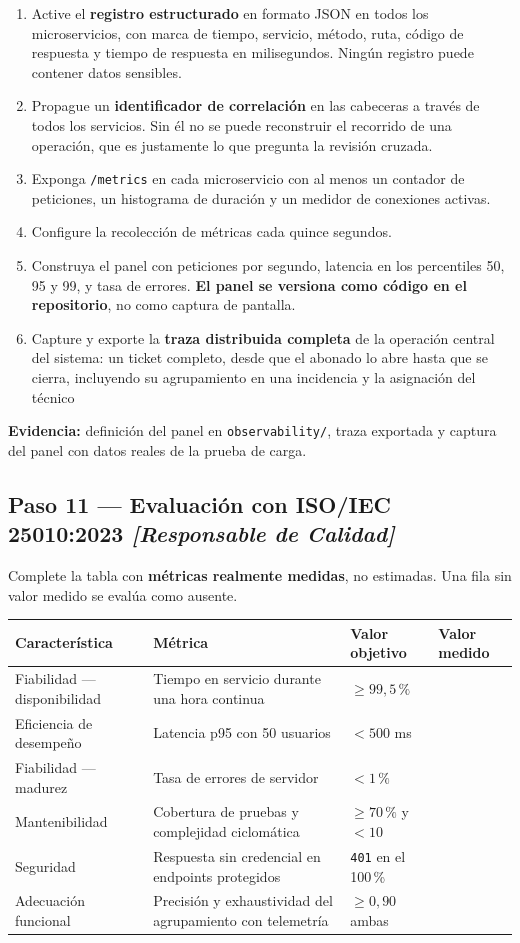 \documentclass[11pt,a4paper]{article}
\newcommand{\paso}[1]{\subsection{#1}}
\begin{document}
	\begin{enumerate}[leftmargin=*,itemsep=4pt]
		\item Active el \textbf{registro estructurado} en formato JSON en todos los microservicios, con marca de tiempo, servicio, método, ruta, código de respuesta y tiempo de respuesta en milisegundos. Ningún registro puede contener datos sensibles.
		\item Propague un \textbf{identificador de correlación} en las cabeceras a través de todos los servicios. Sin él no se puede reconstruir el recorrido de una operación, que es justamente lo que pregunta la revisión cruzada.
		\item Exponga \texttt{/metrics} en cada microservicio con al menos un contador de peticiones, un histograma de duración y un medidor de conexiones activas.
		\item Configure la recolección de métricas cada quince segundos.
		\item Construya el panel con peticiones por segundo, latencia en los percentiles 50, 95 y 99, y tasa de errores. \textbf{El panel se versiona como código en el repositorio}, no como captura de pantalla.
		\item Capture y exporte la \textbf{traza distribuida completa} de la operación central del sistema: un ticket completo, desde que el abonado lo abre hasta que se cierra, incluyendo su agrupamiento en una incidencia y la asignación del técnico
	\end{enumerate}
	
	\textbf{Evidencia:} definición del panel en \texttt{observability/}, traza exportada y captura del panel con datos reales de la prueba de carga.
	
	\paso{Paso 11 --- Evaluación con ISO/IEC 25010:2023 \emph{[Responsable de Calidad]}}
	
	Complete la tabla con \textbf{métricas realmente medidas}, no estimadas. Una fila sin valor medido se evalúa como ausente.
	
	\begin{center}
		\small
		\begin{tabular}{@{}p{3.5cm}p{5.6cm}p{2.6cm}p{2.6cm}@{}}
			\toprule
			\textbf{Característica} & \textbf{Métrica} & \textbf{Valor objetivo} & \textbf{Valor medido} \\
			\midrule
			Fiabilidad --- disponibilidad & Tiempo en servicio durante una hora continua & $\geq 99{,}5\,\%$ & \\
			Eficiencia de desempeño & Latencia p95 con 50 usuarios & $< 500$ ms & \\
			Fiabilidad --- madurez & Tasa de errores de servidor & $< 1\,\%$ & \\
			Mantenibilidad & Cobertura de pruebas y complejidad ciclomática & $\geq 70\,\%$ y $< 10$ & \\
			Seguridad & Respuesta sin credencial en endpoints protegidos & \texttt{401} en el 100\,\% & \\
			Adecuación funcional & Precisión y exhaustividad del agrupamiento con telemetría & $\geq 0{,}90$ ambas & \\
			\bottomrule
		\end{tabular}
	\end{center}
	
\end{document}
